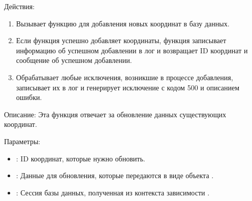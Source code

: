 \documentclass[letterpaper,10pt,russian]{sphinxmanual}
\begin{document}
\sphinxAtStartPar
Действия:
\begin{enumerate}
%
\item {} 
\sphinxAtStartPar
Вызывает функцию  для добавления новых координат в базу данных.

\item {} 
\sphinxAtStartPar
Если функция  успешно добавляет координаты, функция записывает информацию об успешном добавлении в лог и возвращает ID координат и сообщение об успешном добавлении.

\item {} 
\sphinxAtStartPar
Обрабатывает любые исключения, возникшие в процессе добавления, записывает их в лог и генерирует исключение  с кодом 500 и описанием ошибки.

\end{enumerate}

\sphinxAtStartPar
{}

\sphinxAtStartPar
Описание: Эта функция отвечает за обновление данных существующих координат.

\sphinxAtStartPar
Параметры:
\begin{itemize}
\item {} 
\sphinxAtStartPar
{}: ID координат, которые нужно обновить.

\item {} 
\sphinxAtStartPar
{}: Данные для обновления, которые передаются в виде объекта .

\item {} 
\sphinxAtStartPar
{}: Сессия базы данных, полученная из контекста зависимости .

\end{itemize}
\end{document}
